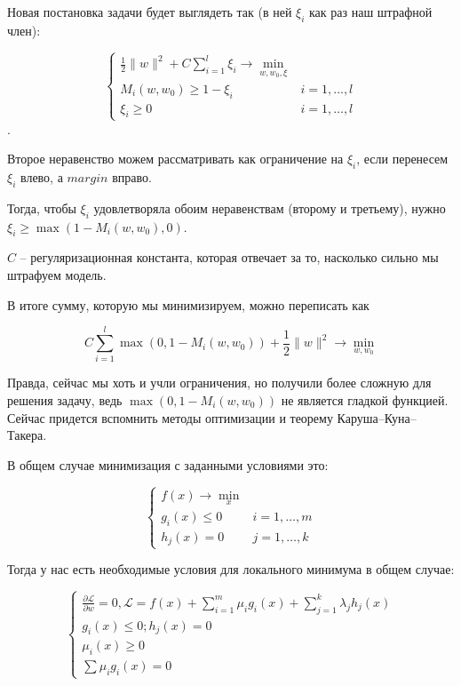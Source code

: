 Новая постановка задачи будет выглядеть так (в ней $\xi_i$ как раз наш штрафной член):

$$\begin{cases}
   \frac{1}{2}\|w\|^2 + C\sum\limits_{i=1}^l \xi_i \to \min\limits_{w, w_0, \xi}\\
   M_i(w, w_0) \geqslant 1 - \xi_i & i = 1, \dots, l\\
   \xi_i \geqslant 0 & i = 1, \dots, l
 \end{cases}$$.

 Второе неравенство можем рассматривать как ограничение на $\xi_i$, если перенесем $\xi_i$ влево, а $margin$ вправо.

 Тогда, чтобы $\xi_i$ удовлетворяла обоим неравенствам (второму и третьему), нужно $\xi_i \geqslant \max(1 - M_i(w, w_0), 0)$.

 $C$ -- регуляризационная константа, которая отвечает за то, насколько сильно мы штрафуем модель.

 В итоге сумму, которую мы минимизируем, можно переписать как 

 $$C\sum\limits_{i=1}^l \max(0, 1- M_i(w, w_0)) + \frac{1}{2} \|w\|^2 \to \min\limits_{w, w_0}$$

 Правда, сейчас мы хоть и учли ограничения, но получили более сложную для решения задачу, ведь $\max(0, 1- M_i(w, w_0))$ не является гладкой функцией.\\

 Сейчас придется вспомнить методы оптимизации и теорему Каруша--Куна--Такера.

 В общем случае минимизация с заданными условиями это:

 $$\begin{cases}
   f(x) \to \min\limits_x\\
   g_i(x) \leqslant 0 & i = 1, \dots, m\\
   h_j(x) = 0 & j = 1, \dots, k
 \end{cases}$$

 Тогда у нас есть необходимые условия для локального минимума в общем случае:

 $$\begin{cases}
   \frac{\partial \mathcal{L}}{\partial w} = 0, \mathcal{L} = f(x) + \sum\limits_{i=1}^m \mu_ig_i(x) + \sum\limits_{j=1}^k \lambda_jh_j(x)\\
   g_i(x) \leqslant 0; h_j(x) = 0\\
   \mu_i(x) \geqslant 0\\
   \sum\mu_ig_i(x) = 0
 \end{cases}$$

